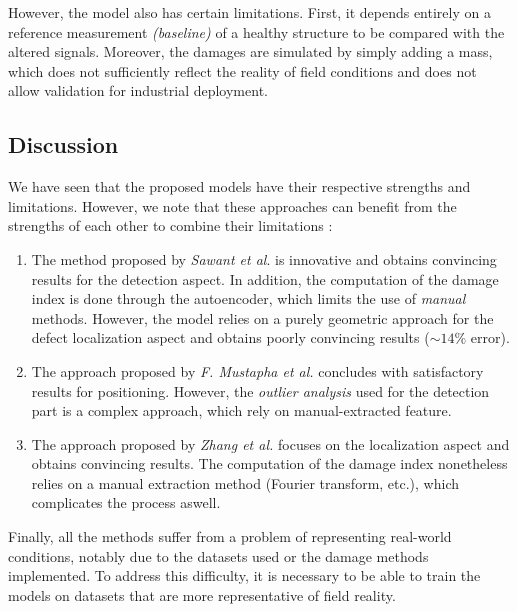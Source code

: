 \documentclass[12pt]{article}
\begin{document}
However, the model also has certain limitations. First, it depends entirely on a reference measurement \textit{(baseline)} of a healthy structure to be compared with the altered signals. Moreover, the damages are simulated by simply adding a mass, which does not sufficiently reflect the reality of field conditions and does not allow validation for industrial deployment.
 
\subsection{Discussion}
 
We have seen that the proposed models have their respective strengths and limitations. However, we note that these approaches can benefit from the strengths of each other to combine their limitations :
 
\begin{enumerate}[itemsep=8pt]
 
    \item The method proposed by \textit{Sawant et al}. \cite{SAWANT2023106931} is innovative and obtains convincing results for the detection aspect. In addition, the computation of the damage index is done through the autoencoder, which limits the use of \textit{manual} methods. However, the model relies on a purely geometric approach for the defect localization aspect and obtains poorly convincing results ($\sim14\%$ error).  
 
    \item The approach proposed by \textit{F. Mustapha et al.} \cite{MUSTAPHA20071885} concludes with satisfactory results for positioning. However, the \textit{outlier analysis} used for the detection part is a complex approach, which rely on manual-extracted feature.
 
    \item The approach proposed by \textit{Zhang et al.} \cite{ZHANG2021107107} focuses on the localization aspect and obtains convincing results. The computation of the damage index nonetheless relies on a manual extraction method (Fourier transform, etc.), which complicates the process aswell. 
 
\end{enumerate} 
 
Finally, all the methods suffer from a problem of representing real-world conditions, notably due to the datasets used or the damage methods implemented. To address this difficulty, it is necessary to be able to train the models on datasets that are more representative of field reality. 
 
\end{document}
